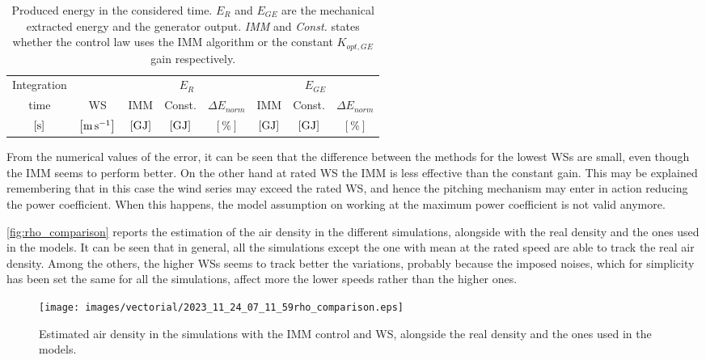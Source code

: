 \begin{table}[!htbp]
  \caption{Produced energy in the considered time. $E_R$ and $E_{GE}$ are the mechanical extracted energy and the generator output. \textit{IMM} and \textit{Const.} states whether the control law uses the IMM algorithm or the constant $K_{opt,GE}$ gain respectively.}
  \centering
  \begin{tabular}{cc|ccc|ccc}
    \toprule
    Integration & & \multicolumn{3}{c|}{$E_R$} & \multicolumn{3}{c}{$E_{GE}$}\\
    time & WS & IMM & Const. & $\Delta E_{norm}$ & IMM & Const. & $\Delta E_{norm}$\\
    $\left[\si{\second}\right]$ & $\left[\si{\meter\per\second}\right]$ & $\left[\si{\giga\joule}\right]$ &   $\left[\si{\giga\joule}\right]$ & $\left[\%\right]$& $\left[\si{\giga\joule}\right]$ &   $\left[\si{\giga\joule}\right]$ & $\left[\%\right]$ \\
    \midrule
    
  \end{tabular}
  \label{tab:comparison_IMM}
\end{table}

From the numerical values of the error, it can be seen that the difference between the methods for the lowest WSs are small, even though the IMM seems to perform better. On the other hand at rated WS the IMM is less effective than the constant gain. This may be explained remembering that in this case the wind series may exceed the rated WS, and hence the pitching mechanism may enter in action reducing the power coefficient. When this happens, the model assumption on working at the maximum power coefficient is not valid anymore.

\autoref{fig:rho_comparison} reports the estimation of the air density in the different simulations, alongside with the real density and the ones used in the models. It can be seen that in general, all the simulations except the one with mean at the rated speed are able to track the real air density. Among the others, the higher WSs seems to track better the variations, probably because the imposed noises, which for simplicity has been set the same for all the simulations, affect more the lower speeds rather than the higher ones.
\begin{figure}[!htbp]
  \centering
  \texttt{[image: images/vectorial/2023\_11\_24\_07\_11\_59rho\_comparison.eps]}
  \caption{Estimated air density in the simulations with the IMM control and WS, alongside the real density and the ones used in the models.}
  \label{fig:rho_comparison}
\end{figure}

